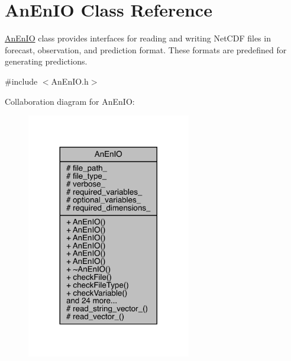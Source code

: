 \hypertarget{class_an_en_i_o}{}\section{An\+En\+IO Class Reference}
\label{class_an_en_i_o}


\mbox{\hyperlink{class_an_en_i_o}{An\+En\+IO}} class provides interfaces for reading and writing Net\+C\+DF files in forecast, observation, and prediction format. These formats are predefined for generating predictions.  




{\ttfamily \#include $<$An\+En\+I\+O.\+h$>$}



Collaboration diagram for An\+En\+IO\+:\nopagebreak
\begin{figure}[H]
\begin{center}
\leavevmode
\includegraphics[width=203pt]{class_an_en_i_o__coll__graph}
\end{center}
\end{figure}
